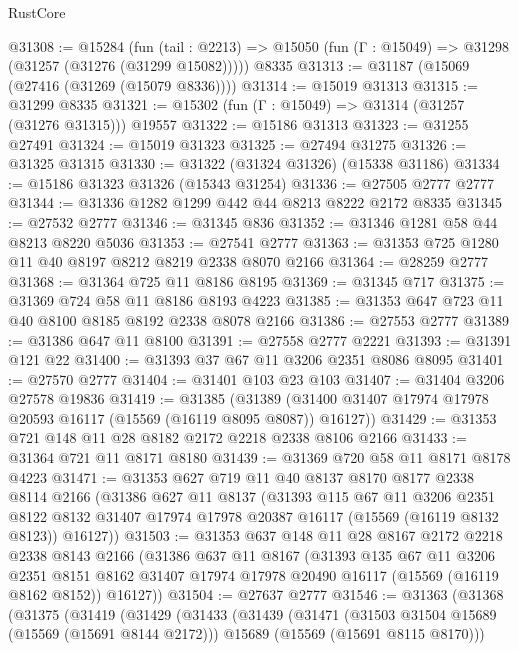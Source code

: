 \begin{lexlean}{RustCore}
\begin{coremodule}
@31308 := @15284
    (fun (tail : @2213) => @15050 (fun (Γ : @15049) => @31298 (@31257 (@31276 (@31299 @15082)))))
    @8335
@31313 := @31187 (@15069 (@27416 (@31269 (@15079 @8336))))
@31314 := @15019 @31313
@31315 := @31299 @8335
@31321 := @15302 (fun (Γ : @15049) => @31314 (@31257 (@31276 @31315))) @19557
@31322 := @15186 @31313
@31323 := @31255 @27491
@31324 := @15019 @31323
@31325 := @27494 @31275
@31326 := @31325 @31315
@31330 := @31322 (@31324 @31326) (@15338 @31186)
@31334 := @15186 @31323 @31326 (@15343 @31254)
@31336 := @27505 @2777 @2777
@31344 := @31336 @1282 @1299 @442 @44 @8213 @8222 @2172 @8335
@31345 := @27532 @2777
@31346 := @31345 @836
@31352 := @31346 @1281 @58 @44 @8213 @8220 @5036
@31353 := @27541 @2777
@31363 := @31353 @725 @1280 @11 @40 @8197 @8212 @8219 @2338 @8070 @2166
@31364 := @28259 @2777
@31368 := @31364 @725 @11 @8186 @8195
@31369 := @31345 @717
@31375 := @31369 @724 @58 @11 @8186 @8193 @4223
@31385 := @31353 @647 @723 @11 @40 @8100 @8185 @8192 @2338 @8078 @2166
@31386 := @27553 @2777
@31389 := @31386 @647 @11 @8100
@31391 := @27558 @2777 @2221
@31393 := @31391 @121 @22
@31400 := @31393 @37 @67 @11 @3206 @2351 @8086 @8095
@31401 := @27570 @2777
@31404 := @31401 @103 @23 @103
@31407 := @31404 @3206 @27578 @19836
@31419 := @31385
    (@31389 (@31400 @31407 @17974 @17978 @20593 @16117 (@15569 (@16119 @8095 @8087)) @16127))
@31429 := @31353 @721 @148 @11 @28 @8182 @2172 @2218 @2338 @8106 @2166
@31433 := @31364 @721 @11 @8171 @8180
@31439 := @31369 @720 @58 @11 @8171 @8178 @4223
@31471 := @31353
    @627
    @719
    @11
    @40
    @8137
    @8170
    @8177
    @2338
    @8114
    @2166
    (@31386
      @627
      @11
      @8137
      (@31393
        @115
        @67
        @11
        @3206
        @2351
        @8122
        @8132
        @31407
        @17974
        @17978
        @20387
        @16117
        (@15569 (@16119 @8132 @8123))
        @16127))
@31503 := @31353
    @637
    @148
    @11
    @28
    @8167
    @2172
    @2218
    @2338
    @8143
    @2166
    (@31386
      @637
      @11
      @8167
      (@31393
        @135
        @67
        @11
        @3206
        @2351
        @8151
        @8162
        @31407
        @17974
        @17978
        @20490
        @16117
        (@15569 (@16119 @8162 @8152))
        @16127))
@31504 := @27637 @2777
@31546 := @31363
    (@31368
      (@31375
        (@31419
          (@31429
            (@31433
              (@31439
                (@31471
                  (@31503 @31504 @15689 (@15569 (@15691 @8144 @2172)))
                  @15689
                  (@15569 (@15691 @8115 @8170)))

\end{coremodule}
\end{lexlean}
